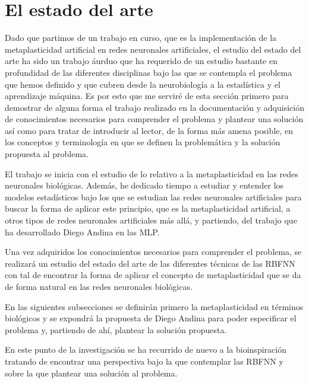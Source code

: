 \documentclass[10pt,a4paper, twocolumn]{report}
\begin{document}
\section{El estado del arte}
Dado que partimos de un trabajo en curso, que es la implementación de la metaplasticidad artificial en redes neuronales artificiales, el estudio del estado del arte ha sido un trabajo áurduo que ha requerido de un estudio bastante en profundidad de las diferentes disciplinas bajo las que se contempla el problema que hemos definido y que cubren desde la neurobiología a la estadística y el aprendizaje máquina. Es por esto que me serviré de esta sección primero para demostrar de alguna forma el trabajo realizado en la documentación y adquisición de conocimientos necesarios para comprender el problema y plantear una solución así como para tratar de introducir al lector, de la forma más amena posible, en los conceptos y terminología en que se definen la problemática y la solución propuesta al problema.

El trabajo se inicia con el estudio de lo relativo a la metaplasticidad en las redes neuronales biológicas. Además, he dedicado tiempo a estudiar y entender los modelos estadísticos bajo los que se estudian las redes neuronales artificiales para buscar la forma de aplicar este principio, que es la metaplasticidad artificial, a otros tipos de redes neuronales artificiales más allá, y partiendo, del trabajo que ha desarrollado Diego Andina en las MLP.

Una vez adquiridos los conocimientos necesarios para comprender el problema, se realizará un estudio del estado del arte de las diferentes técnicas de las RBFNN con tal de encontrar la forma de aplicar el concepto de metaplasticidad que se da de forma natural en las redes neuronales biológicas.

En las siguientes subsecciones se definirán primero la metaplasticidad en términos biológicos y se expondrá la propuesta de Diego Andina para poder especificar el problema y, partiendo de ahí, plantear la solución propuesta. 

En este punto de la investigación se ha recurrido de nuevo a la bioinspiración tratando de encontrar una perspectiva bajo la que contemplar las RBFNN y sobre la que plantear una solución al problema. 

\end{document}
